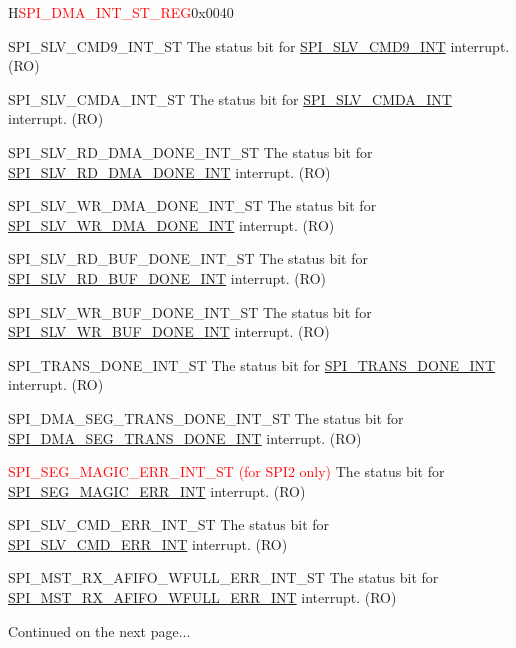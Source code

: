 \begin{register}{H}{\textcolor{red}{SPI\_DMA\_INT\_ST\_REG}}{0x{}0040}
\begin{regdesc}
\begin{reglist}
\label{fielddesc:SPISLVCMD9INTST}\item [SPI\_SLV\_CMD9\_INT\_ST] The status bit for \hyperref[int:SPISLVCMD9INT]{SPI\_SLV\_CMD9\_INT} interrupt. (RO)
\label{fielddesc:SPISLVCMDAINTST}\item [SPI\_SLV\_CMDA\_INT\_ST] The status bit for \hyperref[int:SPISLVCMDAINT]{SPI\_SLV\_CMDA\_INT} interrupt. (RO)
\label{fielddesc:SPISLVRDDMADONEINTST}\item [SPI\_SLV\_RD\_DMA\_DONE\_INT\_ST] The status bit for \hyperref[int:SPISLVRDDMADONEINT]{SPI\_SLV\_RD\_DMA\_DONE\_INT} interrupt. (RO)
\label{fielddesc:SPISLVWRDMADONEINTST}\item [SPI\_SLV\_WR\_DMA\_DONE\_INT\_ST] The status bit for \hyperref[int:SPISLVWRDMADONEINT]{SPI\_SLV\_WR\_DMA\_DONE\_INT} interrupt. (RO)
\label{fielddesc:SPISLVRDBUFDONEINTST}\item [SPI\_SLV\_RD\_BUF\_DONE\_INT\_ST] The status bit for \hyperref[int:SPISLVRDBUFDONEINT]{SPI\_SLV\_RD\_BUF\_DONE\_INT} interrupt. (RO)
\label{fielddesc:SPISLVWRBUFDONEINTST}\item [SPI\_SLV\_WR\_BUF\_DONE\_INT\_ST] The status bit for \hyperref[int:SPISLVWRBUFDONEINT]{SPI\_SLV\_WR\_BUF\_DONE\_INT} interrupt. (RO)
\label{fielddesc:SPITRANSDONEINTST}\item [SPI\_TRANS\_DONE\_INT\_ST] The status bit for \hyperref[int:SPITRANSDONEINT]{SPI\_TRANS\_DONE\_INT} interrupt. (RO)
\label{fielddesc:SPIDMASEGTRANSDONEINTST}\item [SPI\_DMA\_SEG\_TRANS\_DONE\_INT\_ST] The status bit for \hyperref[int:SPIDMASEGTRANSDONEINT]{SPI\_DMA\_SEG\_TRANS\_DONE\_INT} interrupt. (RO)
\label{fielddesc:SPISEGMAGICERRINTST}\item [\textcolor{red}{SPI\_SEG\_MAGIC\_ERR\_INT\_ST (for SPI2 only)}] The status bit for \hyperref[int:SPISEGMAGICERRINT]{SPI\_SEG\_MAGIC\_ERR\_INT} interrupt. (RO)
\label{fielddesc:SPISLVCMDERRINTST}\item [SPI\_SLV\_CMD\_ERR\_INT\_ST] The status bit for \hyperref[int:SPISLVCMDERRINT]{SPI\_SLV\_CMD\_ERR\_INT} interrupt. (RO)
\label{fielddesc:SPIMSTRXAFIFOWFULLERRINTST}\item [SPI\_MST\_RX\_AFIFO\_WFULL\_ERR\_INT\_ST] The status bit for \hyperref[int:SPIMSTRXAFIFOWFULLERRINT]{SPI\_MST\_RX\_AFIFO\_WFULL\_ERR\_INT} interrupt. (RO)


\item [Continued on the next page...]
\end{reglist}\end{regdesc}
\end{register}

